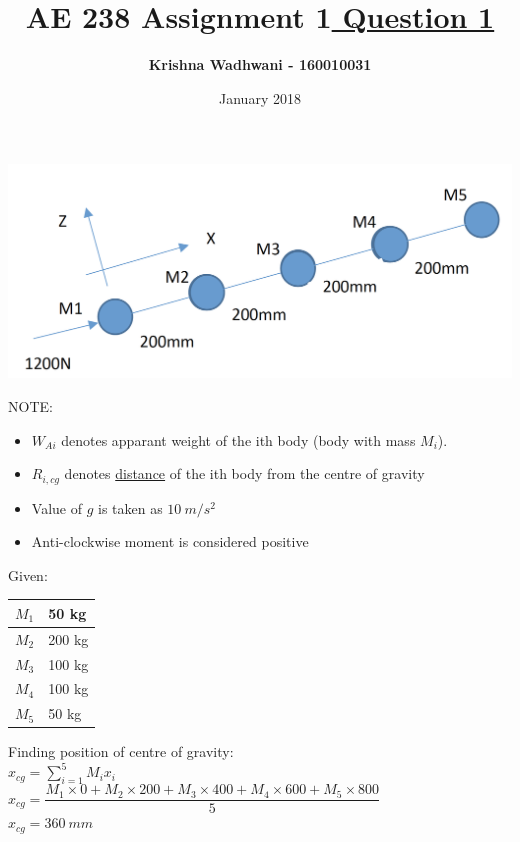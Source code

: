 \documentclass{article}
\title{\Huge \textbf{AE 238 Assignment 1}}
\author{\Huge \textbf{Krishna Wadhwani - 160010031 }}
\date{January 2018}
\begin{document}
\maketitle

\begin{center}
\title{\textbf{\underline{ \LARGE Question 1}}}
\includegraphics[scale=0.4]{238Q1.png}
\end{center}

NOTE: \begin{itemize}
    \item $W_{Ai}$ denotes apparant weight of the ith body (body with mass $M_i$).
    \item $R_{i,cg}$ denotes \underline{distance} of the ith body from the centre of gravity
    \item Value of $g$ is taken as $10\ m/s^2$
    \item Anti-clockwise moment is considered positive
\end{itemize}
Given: \\

\begin{tabular}{ | m{1cm} | m{1cm}|} 
\hline
$M_1$ & 50 kg  \\ 
\hline
$M_2$ & 200 kg  \\  
\hline
$M_3$ & 100 kg \\ 
\hline
$M_4$ & 100 kg  \\ 
\hline
$M_5$ & 50 kg\\
\hline
\end{tabular}
\bigbreak

\noindent Finding position of centre of gravity: \\

\noindent $x_{cg}= \sum_{i=1}^5 M_ix_i$\\
$x_{cg}=\dfrac{M_1 \times 0 + M_2 \times 200 + M_3 \times 400 + M_4 \times 600 + M_5 \times 800}{5}$\\
$x_{cg}= 360\ mm$\\
\end{document}
